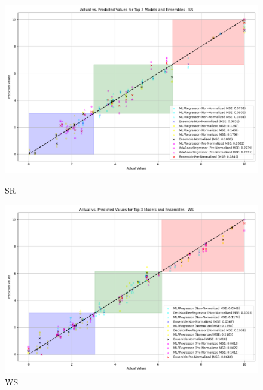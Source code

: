 \begin{figure}[H]
    \centering
    \begin{minipage}{0.45\textwidth}
        \centering
        \includegraphics[width=\linewidth]{reg_section_specific/ensemble_learning/actual_vs_predicted_top_3_models_and_ensembles_SR.png}
        \caption{SR}
        \label{reg_spec_fig:sr_ensemble}
    \end{minipage}\hfill
    \begin{minipage}{0.45\textwidth}
        \centering
        \includegraphics[width=\linewidth]{reg_section_specific/ensemble_learning/actual_vs_predicted_top_3_models_and_ensembles_WS.png}
        \caption{WS}
        \label{reg_spec_fig:ws_ensemble}
    \end{minipage}
\end{figure}

